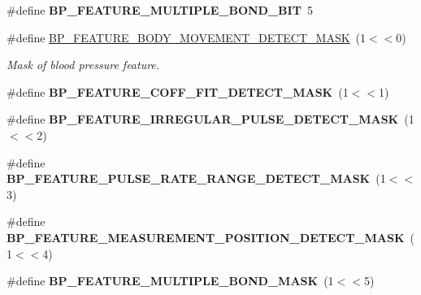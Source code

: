 \begin{DoxyCompactItemize}
\item 
\#define {\bfseries B\+P\+\_\+\+F\+E\+A\+T\+U\+R\+E\+\_\+\+M\+U\+L\+T\+I\+P\+L\+E\+\_\+\+B\+O\+N\+D\+\_\+\+B\+IT}~5\hypertarget{group___b_l_e___b_p_s_ga311f3c6944af1c8917b8576421e1fc6b}{}\label{group___b_l_e___b_p_s_ga311f3c6944af1c8917b8576421e1fc6b}

\item 
\#define \hyperlink{group___b_l_e___b_p_s_ga1c95ee545686a7df2bf3f1b0c041dd0c}{B\+P\+\_\+\+F\+E\+A\+T\+U\+R\+E\+\_\+\+B\+O\+D\+Y\+\_\+\+M\+O\+V\+E\+M\+E\+N\+T\+\_\+\+D\+E\+T\+E\+C\+T\+\_\+\+M\+A\+SK}~(1$<$$<$0)\hypertarget{group___b_l_e___b_p_s_ga1c95ee545686a7df2bf3f1b0c041dd0c}{}\label{group___b_l_e___b_p_s_ga1c95ee545686a7df2bf3f1b0c041dd0c}

\begin{DoxyCompactList}\small\item\em Mask of blood pressure feature. \end{DoxyCompactList}\item 
\#define {\bfseries B\+P\+\_\+\+F\+E\+A\+T\+U\+R\+E\+\_\+\+C\+O\+F\+F\+\_\+\+F\+I\+T\+\_\+\+D\+E\+T\+E\+C\+T\+\_\+\+M\+A\+SK}~(1$<$$<$1)\hypertarget{group___b_l_e___b_p_s_ga914bcc9fcdea3e92ac4d4d5157904e5d}{}\label{group___b_l_e___b_p_s_ga914bcc9fcdea3e92ac4d4d5157904e5d}

\item 
\#define {\bfseries B\+P\+\_\+\+F\+E\+A\+T\+U\+R\+E\+\_\+\+I\+R\+R\+E\+G\+U\+L\+A\+R\+\_\+\+P\+U\+L\+S\+E\+\_\+\+D\+E\+T\+E\+C\+T\+\_\+\+M\+A\+SK}~(1$<$$<$2)\hypertarget{group___b_l_e___b_p_s_ga2502aab994f16b5aa3e513514f9a211a}{}\label{group___b_l_e___b_p_s_ga2502aab994f16b5aa3e513514f9a211a}

\item 
\#define {\bfseries B\+P\+\_\+\+F\+E\+A\+T\+U\+R\+E\+\_\+\+P\+U\+L\+S\+E\+\_\+\+R\+A\+T\+E\+\_\+\+R\+A\+N\+G\+E\+\_\+\+D\+E\+T\+E\+C\+T\+\_\+\+M\+A\+SK}~(1$<$$<$3)\hypertarget{group___b_l_e___b_p_s_gaa98d8e6f55d3b80ffdbf5a23d0a09f71}{}\label{group___b_l_e___b_p_s_gaa98d8e6f55d3b80ffdbf5a23d0a09f71}

\item 
\#define {\bfseries B\+P\+\_\+\+F\+E\+A\+T\+U\+R\+E\+\_\+\+M\+E\+A\+S\+U\+R\+E\+M\+E\+N\+T\+\_\+\+P\+O\+S\+I\+T\+I\+O\+N\+\_\+\+D\+E\+T\+E\+C\+T\+\_\+\+M\+A\+SK}~(1$<$$<$4)\hypertarget{group___b_l_e___b_p_s_gaff2b384d6b0b90799d6a6b04f6f069b1}{}\label{group___b_l_e___b_p_s_gaff2b384d6b0b90799d6a6b04f6f069b1}

\item 
\#define {\bfseries B\+P\+\_\+\+F\+E\+A\+T\+U\+R\+E\+\_\+\+M\+U\+L\+T\+I\+P\+L\+E\+\_\+\+B\+O\+N\+D\+\_\+\+M\+A\+SK}~(1$<$$<$5)\hypertarget{group___b_l_e___b_p_s_gabded17ac413acfcbc18ec10f006bb97d}{}\label{group___b_l_e___b_p_s_gabded17ac413acfcbc18ec10f006bb97d}


\end{DoxyCompactItemize}
